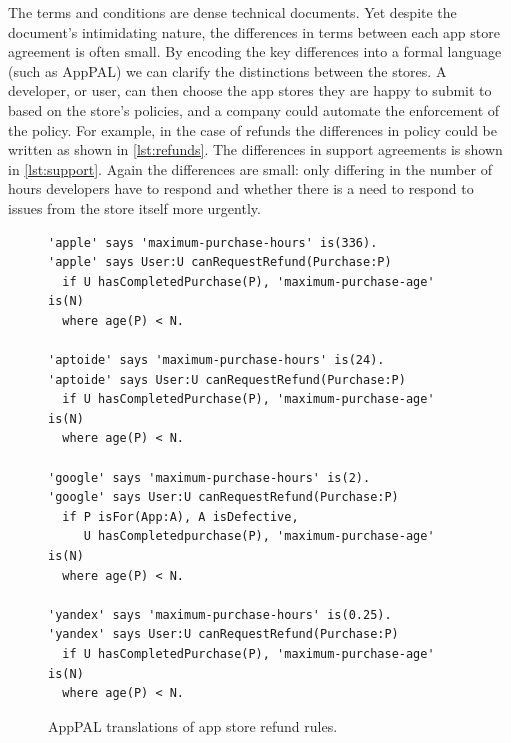 \documentclass[thesis.tex]{subfiles}
\begin{document}
The terms and conditions are dense technical documents. Yet despite
the document's intimidating nature, the differences in terms between each app store
agreement is often small. By encoding the key differences into a
formal language (such as AppPAL) we can clarify the distinctions
between the stores. A developer, or user, can then choose the app
stores they are happy to submit to based on the store's policies, and
a company could automate the enforcement of the policy. For example,
in the case of refunds the differences in policy could be written as
shown in \autoref{lst:refunds}. The differences in support agreements
is shown in \autoref{lst:support}. Again the differences are small:
only differing in the number of hours developers have to respond and
whether there is a need to respond to issues from the store itself
more urgently.

\begin{figure}\centering
\begin{lstlisting}
'apple' says 'maximum-purchase-hours' is(336).
'apple' says User:U canRequestRefund(Purchase:P)
  if U hasCompletedPurchase(P), 'maximum-purchase-age' is(N)
  where age(P) < N.

'aptoide' says 'maximum-purchase-hours' is(24).
'aptoide' says User:U canRequestRefund(Purchase:P)
  if U hasCompletedPurchase(P), 'maximum-purchase-age' is(N)
  where age(P) < N.

'google' says 'maximum-purchase-hours' is(2).
'google' says User:U canRequestRefund(Purchase:P)
  if P isFor(App:A), A isDefective,
     U hasCompletedpurchase(P), 'maximum-purchase-age' is(N)
  where age(P) < N.

'yandex' says 'maximum-purchase-hours' is(0.25).
'yandex' says User:U canRequestRefund(Purchase:P)
  if U hasCompletedPurchase(P), 'maximum-purchase-age' is(N)
  where age(P) < N.
\end{lstlisting}
\caption{AppPAL translations of app store refund rules.}
\label{lst:refunds}
\end{figure}
\end{document}
